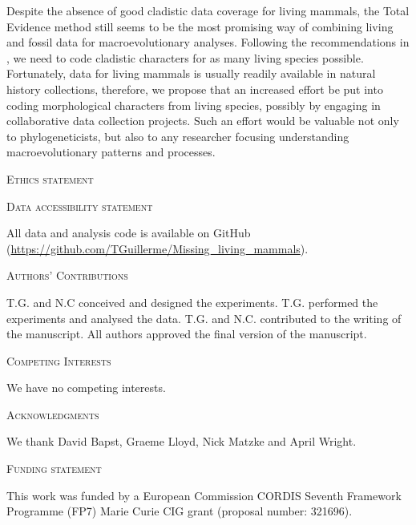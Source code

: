 \documentclass[12pt,letterpaper]{article}
\renewcommand{\section}[1]{%
\bigskip
\begin{center}
\begin{Large}
\normalfont\scshape #1
\medskip
\end{Large}
\end{center}}
\begin{document}
Despite the absence of good cladistic data coverage for living mammals, the Total Evidence method still seems to be the most promising way of combining living and fossil data for macroevolutionary analyses. 
Following the recommendations in \cite{GuillermeCooper}, we need to code cladistic characters for as many living species possible. 
Fortunately, data for living mammals is usually readily available in natural history collections, therefore, we propose that an increased effort be put into coding morphological characters from living species, possibly by engaging in collaborative data collection projects.
Such an effort would be valuable not only to phylogeneticists, but also to any researcher focusing understanding macroevolutionary patterns and processes.

\section{Ethics statement}
\section{Data accessibility statement}
All data and analysis code is available on GitHub (\url{https://github.com/TGuillerme/Missing_living_mammals}).
\section{Authors' Contributions}
T.G. and N.C conceived and designed the experiments. T.G. performed the experiments and analysed the data. T.G. and N.C. contributed to the writing of the manuscript. All authors approved the final version of the manuscript.
\section{Competing Interests}
We have no competing interests.
\section{Acknowledgments}
We thank David Bapst, Graeme Lloyd, Nick Matzke and April Wright.
\section{Funding statement}
This work was funded by a European Commission CORDIS Seventh Framework Programme (FP7) Marie Curie CIG grant (proposal number: 321696).




\end{document}
